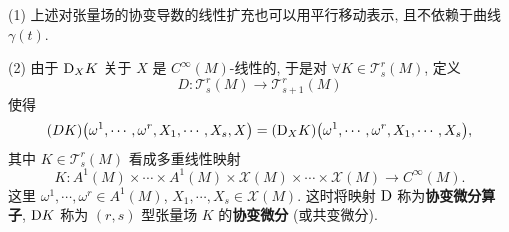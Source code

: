 \begin{remark}
  (1) 上述对张量场的协变导数的线性扩充也可以用平行移动表示, 且不依赖于曲线 $\gamma(t)$.

  (2) 由于 $\mathrm{D}_XK$ 关于 $X$ 是 $C^{\infty}(M)$-线性的, 于是对 $\forall K\in\mathscr{T}_s^r(M)$, 定义
  \[D\colon \mathscr{T}_s^r(M)\longrightarrow \mathscr{T}_{s+1}^{r}(M)\]
  使得
  \[(DK)\bigl(\omega^1,\cdots,\omega^r,X_1,\cdots,X_s,X\bigr)
    = (\mathrm{D}_XK)\bigl(\omega^1,\cdots,\omega^r,X_1,\cdots,X_s\bigr),\]
  其中 $K\in\mathscr{T}_s^r(M)$ 看成多重线性映射
  \[K\colon A^1(M)\times\cdots\times A^1(M)\times \mathscr{X}(M)\times\cdots\times
    \mathscr{X}(M)\longrightarrow C^{\infty}(M).\]
  这里 $\omega^1,\cdots,\omega^r\in A^1(M)$, $X_1,\cdots,X_s\in\mathscr{X}(M)$.
  这时将映射 $\mathrm{D}$ 称为\textbf{协变微分算子}, 
  $\mathrm{D} K$ 称为 $(r,s)$ 型张量场 $K$ 的\textbf{协变微分} (或共变微分).


\end{remark}
